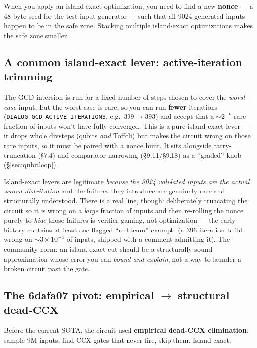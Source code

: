 \documentclass[11pt,a4paper]{article}
\begin{document}
When you apply an island-exact optimization, you need to find a new \textbf{nonce} --- a 48-byte
seed for the test input generator --- such that all 9024 generated inputs happen to be in the
safe zone. Stacking multiple island-exact optimizations makes the safe zone smaller.

\subsection{A common island-exact lever: active-iteration trimming}

The GCD inversion is run for a fixed number of steps chosen to cover the \emph{worst-case} input. But
the worst case is rare, so you can run \textbf{fewer} iterations
(\texttt{DIALOG\_GCD\_ACTIVE\_ITERATIONS}, e.g.\ $399\to393$) and accept that a $\sim2^{-k}$-rare
fraction of inputs won't have fully converged. This is a pure island-exact lever --- it drops whole
divsteps (qubits \emph{and} Toffoli) but makes the circuit wrong on those rare inputs, so it must be
paired with a nonce hunt. It sits alongside carry-truncation (\S7.4) and comparator-narrowing
(\S9.11/\S9.18) as a ``graded'' knob (\S\ref{sec:qubitloop}).

\begin{tcolorbox}[noteboxstyle, title={The line between island-exact and cheating}]
Island-exact levers are legitimate \emph{because the 9024 validated inputs are the actual scored
distribution} and the failures they introduce are genuinely rare and structurally understood. There
is a real line, though: deliberately truncating the circuit so it is wrong on a \emph{large} fraction
of inputs and then re-rolling the nonce purely to \emph{hide} those failures is verifier-gaming, not
optimization --- the early history contains at least one flagged ``red-team'' example (a 396-iteration
build wrong on $\sim$$3\times10^{-4}$ of inputs, shipped with a comment admitting it). The community
norm: an island-exact cut should be a structurally-sound approximation whose error you can
\emph{bound and explain}, not a way to launder a broken circuit past the gate.
\end{tcolorbox}

\subsection{The 6dafa07 pivot: empirical $\to$ structural dead-CCX}

Before the current SOTA, the circuit used \textbf{empirical dead-CCX elimination}: sample 9M
inputs, find CCX gates that never fire, skip them. Island-exact.
\end{document}
